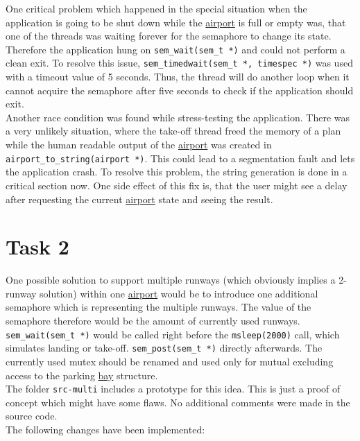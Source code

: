 \documentclass[a4paper, 12pt]{scrartcl} %
\begin{document}
One critical problem which happened in the special situation when the
application is going to be shut down while the \hyperref[sec:airport]{airport}
is full or empty was, that one of the threads was waiting forever for the
semaphore to change its state. Therefore the application hung on
\texttt{sem\_wait(sem\_t *)} and could not perform a clean exit. To resolve
this issue, \texttt{sem\_timedwait(sem\_t *, timespec *)} was used with a
timeout value of 5 seconds. Thus, the thread will do another loop when it
cannot acquire the semaphore after five seconds to check if the application
should exit. \\

Another race condition was found while stress-testing the application. There
was a very unlikely situation, where the take-off thread freed the memory of a
plan while the human readable output of the \hyperref[sec:airport]{airport} was
created in \texttt{airport\_to\_string(airport *)}. This could lead to a
segmentation fault and lets the application crash. To resolve this problem, the
string generation is done in a critical section now. One side effect of this
fix is, that the user might see a delay after requesting the current
\hyperref[sec:airport]{airport} state and seeing the result.

\section{Task 2}

One possible solution to support multiple runways (which obviously implies a
2-runway solution) within one \hyperref[sec:airport]{airport} would be to
introduce one additional semaphore which is representing the multiple runways.
The value of the semaphore therefore would be the amount of currently used
runways. \texttt{sem\_wait(sem\_t *)} would be called right before the
\texttt{msleep(2000)} call, which simulates landing or take-off.
\texttt{sem\_post(sem\_t *)} directly afterwards. The currently used mutex
should be renamed and used only for mutual excluding access to the parking
\hyperref[sec:bay]{bay} structure. \\

The folder \texttt{src-multi} includes a prototype for this idea. This is just
a proof of concept which might have some flaws. No additional comments were
made in the source code. \\

The following changes have been implemented:
\end{document}
